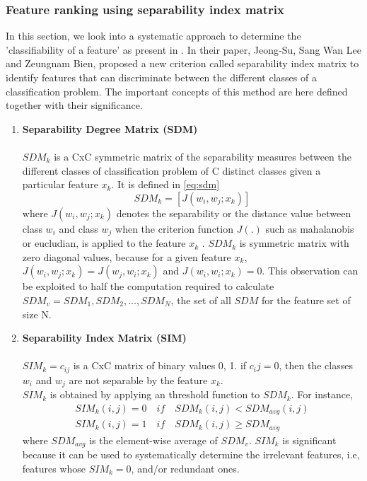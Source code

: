 \subsubsection{Feature ranking using separability index matrix}
In this section, we look into a systematic approach to determine the 'classifiability of a feature' as present in \cite{sima2013}.
In their paper, Jeong-Su, Sang Wan Lee and Zeungnam Bien, proposed a new criterion called separability index matrix to identify features that can discriminate between the different classes of a classification problem.
The important concepts of this method are here defined together with their significance.

\begin{enumerate}
	\item \textbf{Separability Degree Matrix (SDM)}\\\\
	\(SDM_k\) is a CxC symmetric matrix of the separability measures between the different classes of classification problem of C distinct classes given a particular feature \(x_k\).
	It is defined in \ref{eq:sdm}
\subitem \[SDM_k = [J(w_i, w_j; {x_k})] \label{eq:sdm}\]	
\subitem where \(J(w_i, w_j; {x_k})\) denotes the separability or the distance value between class \(w_i\)  and class \(w_j\) when the criterion function \(J(\textbf{.})\) such as mahalanobis \cite{maha2013} or eucludian, is applied to the feature \(x_k\) \cite{sima2013}. 
	\(SDM_k\) is symmetric matrix with zero diagonal values, because for a given feature \(x_k\), \(J(w_i, w_j; {x_k}) = J(w_j, w_i; {x_k})\) and \(J(w_i, w_i; {x_k}) = 0\).
	This observation can be exploited  to half the computation required to calculate \(SDM_v = {SDM_1, SDM_2, ..., SDM_N}\), the set of  all \(SDM\) for the feature set of size N.
	 
	\item \textbf{Separability Index Matrix (SIM)}\\\\
	\(SIM_k = {c_{ij}}\) is a CxC matrix of binary values {0, 1}. if \(c_ij=0\), then the classes \(w_i\) and \(w_j\) are not separable by the feature \(x_k\).\\
	\(SIM_k\) is obtained by applying an threshold function to \(SDM_k\).
	For instance, 
	\begin{align*}
		SIM_k(i, j) = 0 \quad if  \quad SDM_k(i, j) < SDM_{avg}(i, j)\\
		SIM_k(i,j) = 1 \quad if  \quad SDM_k(i,j) \geq SDM_{avg}
	\end{align*}
	where \(SDM_{avg}\) is the element-wise average of \(SDM_v\).
	\(SIM_k\) is significant because it can be used to systematically determine the irrelevant features, i.e, features whose \(SIM_k = 0\), and/or redundant ones. \cite{sima2013}
	

\end{enumerate}
